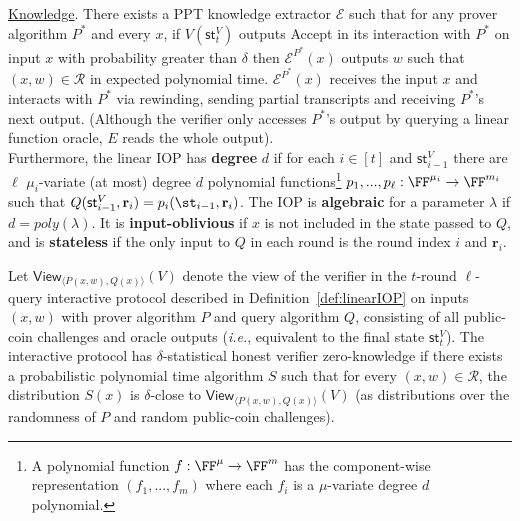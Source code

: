 \begin{definition} 
\noindent \underline{Knowledge}. There exists a PPT knowledge extractor $\mathcal{E}$ such that for any prover algorithm $P^*$ and every $x$, if $V(\textsf{st}^V_t)$ outputs \textsf{Accept} in its interaction with $P^*$ on input $x$ with probability greater than $\delta$ then $\mathcal{E}^{P^*}(x)$ outputs $w$ such that $(x, w) \in \mathcal{R}$ in expected polynomial time. $\mathcal{E}^{P^*}(x)$ receives the input $x$ and interacts with $P^*$ via rewinding, sending partial transcripts and receiving $P^*$'s next output. (Although the verifier only accesses $P^*$'s output by querying a linear function oracle, $E$ reads the whole output).  \\

Furthermore, the linear IOP has \textbf{degree} $d$ if for each $i \in [t]$ and $\textsf{st}^V_{i-1}$ there are $\ell$ $\mu_i$-variate (at most) degree $d$ polynomial functions\footnote{A polynomial function $f:\FF^\mu \rightarrow \FF^m$ has the component-wise representation $(f_1,...,f_m)$ where each $f_i$ is a $\mu$-variate degree $d$ polynomial.}  $p_1,...,p_\ell: \FF^{\mu_i} \rightarrow \FF^{m_i}$ such that $Q(\textsf{st}^V_{i-1}, \mathbf{r}_i) = p_i(\st_{i-1}, \mathbf{r}_i)$. The IOP is \textbf{algebraic} for a parameter $\lambda$ if $d = poly(\lambda)$.
It is \textbf{input-oblivious} if $x$ is not included in the state passed to $Q$, and is \textbf{stateless} if the only input to $Q$ in each round is the round index $i$ and $\mathbf{r}_i$.


\end{definition} 


\begin{definition}
Let $\textsf{View}_{\langle P(x, w), Q(x) \rangle}(V)$ denote the view of the verifier in the $t$-round $\ell$-query interactive protocol described in Definition~\ref{def:linearIOP} on inputs $(x,w)$ with prover algorithm $P$ and query algorithm $Q$, consisting of all public-coin challenges and oracle outputs (\emph{i.e.}, equivalent to the final state $\textsf{st}^V_t$). The interactive protocol has $\delta$-statistical honest verifier zero-knowledge if there exists a probabilistic polynomial time algorithm $S$ such that for every $(x, w) \in \mathcal{R}$, the distribution $S(x)$ is $\delta$-close to $\textsf{View}_{\langle P(x, w), Q(x) \rangle}(V)$ (as distributions over the randomness of $P$ and random public-coin challenges).
\end{definition}

